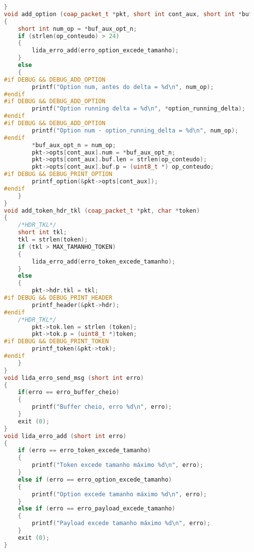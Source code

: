 \begin{lstlisting}[language=C++]
}
void add_option (coap_packet_t *pkt, short int cont_aux, short int *buf_aux_opt_n, char *op_conteudo, short int numopt, short int *option_running_delta)
{
	short int num_op = *buf_aux_opt_n;
	if (strlen(op_conteudo) > 24)
	{
		lida_erro_add(erro_option_excede_tamanho);
	}
	else
	{
#if DEBUG && DEBUG_ADD_OPTION
		printf("Option num, antes do delta = %d\n", num_op);
#endif
#if DEBUG && DEBUG_ADD_OPTION
		printf("Option running delta = %d\n", *option_running_delta);
#endif
#if DEBUG && DEBUG_ADD_OPTION
		printf("Option num - option_running_delta = %d\n", num_op);
#endif
		*buf_aux_opt_n = num_op;
		pkt->opts[cont_aux].num = *buf_aux_opt_n;
		pkt->opts[cont_aux].buf.len = strlen(op_conteudo);
		pkt->opts[cont_aux].buf.p = (uint8_t *) op_conteudo;
#if DEBUG && DEBUG_PRINT_OPTION
		printf_option(&pkt->opts[cont_aux]);
#endif
	}
}
void add_token_hdr_tkl (coap_packet_t *pkt, char *token)
{
	/*HDR_TKL*/
	short int tkl;
	tkl = strlen(token);
	if (tkl > MAX_TAMANHO_TOKEN)
	{
		lida_erro_add(erro_token_excede_tamanho);
	}
	else
	{
		pkt->hdr.tkl = tkl;
#if DEBUG && DEBUG_PRINT_HEADER
		printf_header(&pkt->hdr);
#endif
	/*HDR_TKL*/
		pkt->tok.len = strlen (token);
		pkt->tok.p = (uint8_t *)token;
#if DEBUG && DEBUG_PRINT_TOKEN
		printf_token(&pkt->tok);
#endif
	}
}
void lida_erro_send_msg (short int erro)
{
	if(erro == erro_buffer_cheio)
	{
		printf("Buffer cheio, erro %d\n", erro);
	}
	exit (0);
}
void lida_erro_add (short int erro)
{
	if (erro == erro_token_excede_tamanho)
	{
		printf("Token excede tamanho máximo %d\n", erro);
	}
	else if (erro == erro_option_excede_tamanho)
	{
		printf("Option excede tamanho máximo %d\n", erro);
	}
	else if (erro == erro_payload_excede_tamanho)
	{
		printf("Payload excede tamanho máximo %d\n", erro);
	}
	exit (0);
}


\end{lstlisting}
